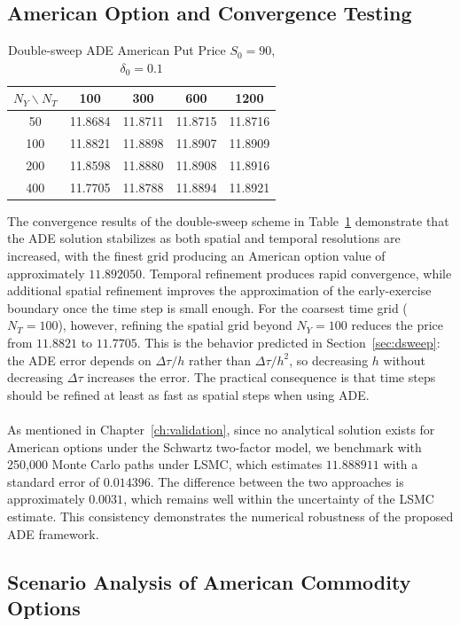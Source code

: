 \documentclass[12pt,a4paper]{article}
\begin{document}
\subsection{American Option and Convergence Testing}
\begin{table}
\centering
\caption{Double-sweep ADE American Put Price $S_0 =90$, $\delta_0 = 0.1$}
\label{tab:table1}
\begin{tabular}{c|cccc}
\hline
$N_Y \backslash N_T$ & 100 & 300 & 600 & 1200\\
\hline
50  & 11.8684 & 11.8711 & 11.8715 & 11.8716\\
100 & 11.8821 & 11.8898 & 11.8907 & 11.8909\\
200 & 11.8598 & 11.8880 & 11.8908 & 11.8916\\
400 & 11.7705 & 11.8788 & 11.8894 & 11.8921\\
\hline
\end{tabular}
\end{table}
The convergence results of the double-sweep scheme in Table~\ref{tab:table1} demonstrate that the ADE solution stabilizes as both spatial and temporal resolutions are increased, with the finest grid producing an American option value of approximately $11.892050$. Temporal refinement produces rapid convergence, while additional spatial refinement improves the approximation of the early-exercise boundary once the time step is small enough. For the coarsest time grid ($N_T=100$), however, refining the spatial grid beyond $N_Y=100$ reduces the price from $11.8821$ to $11.7705$. This is the behavior predicted in Section~\ref{sec:dsweep}: the ADE error depends on $\Delta\tau/h$ rather than $\Delta\tau/h^2$, so decreasing $h$ without decreasing $\Delta\tau$ increases the error. The practical consequence is that time steps should be refined at least as fast as spatial steps when using ADE.
\\\\ As mentioned in Chapter~\ref{ch:validation}, since no analytical solution exists for American options under the Schwartz two-factor model, we benchmark with 250,000 Monte Carlo paths under LSMC, which estimates $11.888911$ with a standard error of $0.014396$. The difference between the two approaches is approximately $0.0031$, which remains well within the uncertainty of the LSMC estimate. This consistency demonstrates the numerical robustness of the proposed ADE framework.

\subsection{Scenario Analysis of American Commodity Options}
\end{document}
